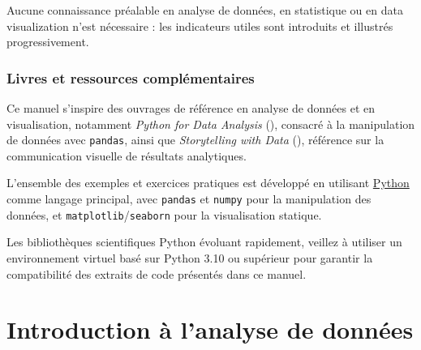 \documentclass[
  french,
  letterpaper,
  open=any]{scrbook}
\makeatletter
\let\ps@plain\ps@empty
\theoremstyle{definition}
\theoremstyle{definition}
\theoremstyle{remark}
\makeatother
\begin{document}
Aucune connaissance préalable en analyse de données, en statistique ou
en data visualization n'est nécessaire : les indicateurs utiles sont
introduits et illustrés progressivement.

\subsection*{Livres et ressources complémentaires}

Ce manuel s'inspire des ouvrages de référence en analyse de données et
en visualisation, notamment \emph{Python for Data Analysis}
(), consacré à la manipulation
de données avec \texttt{pandas}, ainsi que \emph{Storytelling with Data}
(), référence sur la
communication visuelle de résultats analytiques.

L'ensemble des exemples et exercices pratiques est développé en
utilisant \href{https://python.org}{Python} comme langage principal,
avec \texttt{pandas} et \texttt{numpy} pour la manipulation des données,
et \texttt{matplotlib}/\texttt{seaborn} pour la visualisation statique.

\begin{tcolorbox}[enhanced jigsaw, arc=.35mm, bottomrule=.15mm, bottomtitle=1mm, breakable, colback=white, colbacktitle=quarto-callout-note-color!10!white, colframe=quarto-callout-note-color-frame, coltitle=black, left=2mm, leftrule=.75mm, opacityback=0, opacitybacktitle=0.6, rightrule=.15mm, title=\textcolor{quarto-callout-note-color}{\faInfo}\hspace{0.5em}{Note}, titlerule=0mm, toprule=.15mm, toptitle=1mm]

Les bibliothèques scientifiques Python évoluant rapidement, veillez à
utiliser un environnement virtuel basé sur Python 3.10 ou supérieur pour
garantir la compatibilité des extraits de code présentés dans ce manuel.

\end{tcolorbox}

\clearpage
\tableofcontents
\clearpage

\clearpage
\setcounter{chapter}{0}
\pagestyle{headings}
\makeatletter
\let\ps@plain\ps@headings
\makeatother


\chapter{Introduction à l'analyse de
données}\label{introduction-uxe0-lanalyse-de-donnuxe9es}
\end{document}
